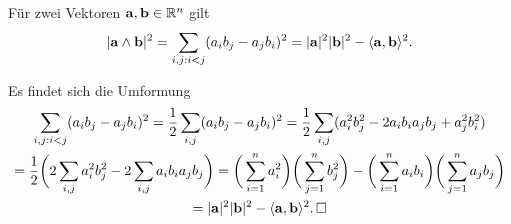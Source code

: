 \begin{Satz}\newlinefirst
Für zwei Vektoren $\mathbf{a},\mathbf{b}\in\mathbb R^n$ gilt
\[|\mathbf{a}\wedge\mathbf{b}|^2 = \sum_{i,j:i<j}(a_i b_j - a_j b_i)^2 
= |\mathbf{a}|^2|\mathbf{b}|^2 - \langle\mathbf{a},\mathbf{b}\rangle^2.\]
\end{Satz}
\begin{Beweis}
Es findet sich die Umformung
\begin{gather*}
\sum_{i,j:i<j}(a_i b_j - a_j b_i)^2 = \frac{1}{2}\sum_{i,j}(a_i b_j - a_j b_i)^2
= \frac{1}{2}\sum_{i,j}(a_i^2 b_j^2 - 2a_i b_i a_j b_j + a_j^2 b_i^2)\\
= \frac{1}{2}\bigg(2\sum_{i,j} a_i^2 b_j^2 - 2\sum_{i,j}a_i b_i a_j b_j\bigg)
= \bigg(\sum_{i=1}^n a_i^2\bigg)\bigg(\sum_{j=1}^n b_j^2\bigg)
- \bigg(\sum_{i=1}^n a_i b_i\bigg)\bigg(\sum_{j=1}^n a_j b_j\bigg)\\
= |\mathbf{a}|^2 |\mathbf{b}|^2 - \langle\mathbf{a},\mathbf{b}\rangle^2.\,\square
\end{gather*}
\end{Beweis}

